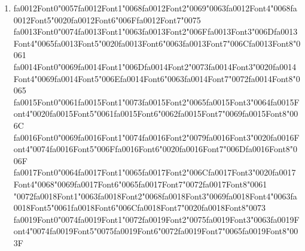 \documentclass[12pt]{article}
\begin{document}
\begin{enumerate}[label=Q\arabic*.]
 \item {\csname fa0012Font0\endcsname\char"0057}{\csname fa0012Font1\endcsname\char"0068}{\csname fa0012Font2\endcsname\char"0069}{\char"0063}{\csname fa0012Font4\endcsname\char"0068}{\csname fa0012Font5\endcsname\char"0020}{\csname fa0012Font6\endcsname\char"006F}{\csname fa0012Font7\endcsname\char"0075} {\csname fa0013Font0\endcsname\char"0074}{\csname fa0013Font1\endcsname\char"0063}{\csname fa0013Font2\endcsname\char"006F}{\csname fa0013Font3\endcsname\char"006D}{\csname fa0013Font4\endcsname\char"0065}{\csname fa0013Font5\endcsname\char"0020}{\csname fa0013Font6\endcsname\char"0063}{\csname fa0013Font7\endcsname\char"006C}{\csname fa0013Font8\endcsname\char"0061} {\csname fa0014Font0\endcsname\char"0069}{\csname fa0014Font1\endcsname\char"006D}{\csname fa0014Font2\endcsname\char"0073}{\csname fa0014Font3\endcsname\char"0020}{\csname fa0014Font4\endcsname\char"0069}{\csname fa0014Font5\endcsname\char"006E}{\csname fa0014Font6\endcsname\char"0063}{\csname fa0014Font7\endcsname\char"0072}{\csname fa0014Font8\endcsname\char"0065} {\csname fa0015Font0\endcsname\char"0061}{\csname fa0015Font1\endcsname\char"0073}{\csname fa0015Font2\endcsname\char"0065}{\csname fa0015Font3\endcsname\char"0064}{\csname fa0015Font4\endcsname\char"0020}{\csname fa0015Font5\endcsname\char"0061}{\csname fa0015Font6\endcsname\char"0062}{\csname fa0015Font7\endcsname\char"0069}{\csname fa0015Font8\endcsname\char"006C} {\csname fa0016Font0\endcsname\char"0069}{\csname fa0016Font1\endcsname\char"0074}{\csname fa0016Font2\endcsname\char"0079}{\csname fa0016Font3\endcsname\char"0020}{\csname fa0016Font4\endcsname\char"0074}{\csname fa0016Font5\endcsname\char"006F}{\csname fa0016Font6\endcsname\char"0020}{\csname fa0016Font7\endcsname\char"006D}{\csname fa0016Font8\endcsname\char"006F} {\csname fa0017Font0\endcsname\char"0064}{\csname fa0017Font1\endcsname\char"0065}{\csname fa0017Font2\endcsname\char"006C}{\csname fa0017Font3\endcsname\char"0020}{\csname fa0017Font4\endcsname\char"0068}{\char"0069}{\csname fa0017Font6\endcsname\char"0065}{\csname fa0017Font7\endcsname\char"0072}{\csname fa0017Font8\endcsname\char"0061} {\char"0072}{\csname fa0018Font1\endcsname\char"0063}{\csname fa0018Font2\endcsname\char"0068}{\csname fa0018Font3\endcsname\char"0069}{\csname fa0018Font4\endcsname\char"0063}{\csname fa0018Font5\endcsname\char"0061}{\csname fa0018Font6\endcsname\char"006C}{\csname fa0018Font7\endcsname\char"0020}{\csname fa0018Font8\endcsname\char"0073} {\csname fa0019Font0\endcsname\char"0074}{\csname fa0019Font1\endcsname\char"0072}{\csname fa0019Font2\endcsname\char"0075}{\csname fa0019Font3\endcsname\char"0063}{\csname fa0019Font4\endcsname\char"0074}{\csname fa0019Font5\endcsname\char"0075}{\csname fa0019Font6\endcsname\char"0072}{\csname fa0019Font7\endcsname\char"0065}{\csname fa0019Font8\endcsname\char"003F}

\end{enumerate}
\end{document}
